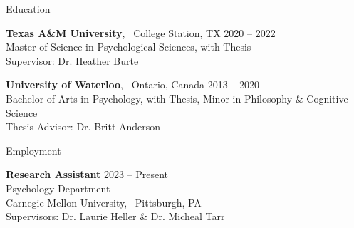 \documentclass{resume} %
\begin{document}
\fancyhead[RO,LE]{\today}


%
%	
%	


\begin{rSection}{Education}
    
    {\textbf{Texas A\&M University}, \ College Station, TX \hfill {2020 -- 2022}
    \\ {Master of Science in Psychological Sciences, with Thesis}
    \\ {Supervisor: Dr. Heather Burte}}

    {\textbf{University of Waterloo}, \ Ontario, Canada \hfill 
    {2013 -- 2020}
    \\ {Bachelor of Arts in Psychology, with Thesis, Minor in Philosophy \& Cognitive Science}
    \\ {Thesis Advisor: Dr. Britt Anderson}}

\end{rSection}


\begin{rSection}{Employment}
	
	{\textbf{Research Assistant} \hfill {2023 -- Present}
		\\ {Psychology Department}
		\\ {Carnegie Mellon University, \ Pittsburgh, PA}
		\\ {Supervisors: Dr. Laurie Heller \& Dr. Micheal Tarr}}
	
\end{rSection}



\end{document}
